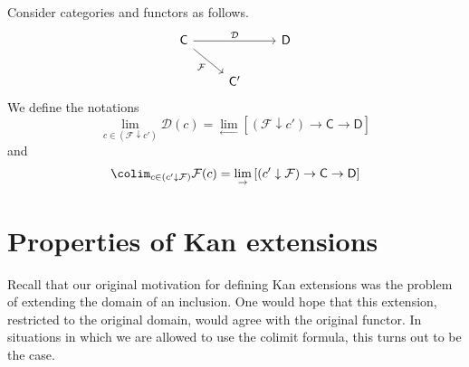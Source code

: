 \documentclass[notes.tex]{subfiles}
\begin{document}
\begin{definition}
  \label{def:limit_over_a_comma_category}
  Consider categories and functors as follows.
  \begin{equation*}
    \begin{tikzcd}
      \mathsf{C}
      \arrow[dr, swap, "\mathcal{F}"]
      \arrow[rr, "\mathcal{D}"]
      && \mathsf{D}
      \\
      & \mathsf{C}'
    \end{tikzcd}
  \end{equation*}
  We define the notations
  \begin{equation*}
    \lim_{c \in (\mathcal{F} \downarrow c')} \mathcal{D}(c) = \lim_{\leftarrow} \left[ (\mathcal{F} \downarrow c') \to \mathsf{C} \to \mathsf{D} \right]
  \end{equation*}
  and
  \begin{equation*}
    \colim_{c \in (c' \downarrow \mathcal{F})} \mathcal{F}(c) = \lim_{\rightarrow} \left[ (c' \downarrow \mathcal{F}) \to \mathsf{C} \to \mathsf{D} \right]
  \end{equation*}
\end{definition}

\section{Properties of Kan extensions}
\label{sec:properties_of_kan_extensions}

Recall that our original motivation for defining Kan extensions was the problem of extending the domain of an inclusion. One would hope that this extension, restricted to the original domain, would agree with the original functor. In situations in which we are allowed to use the colimit formula, this turns out to be the case.
\end{document}
